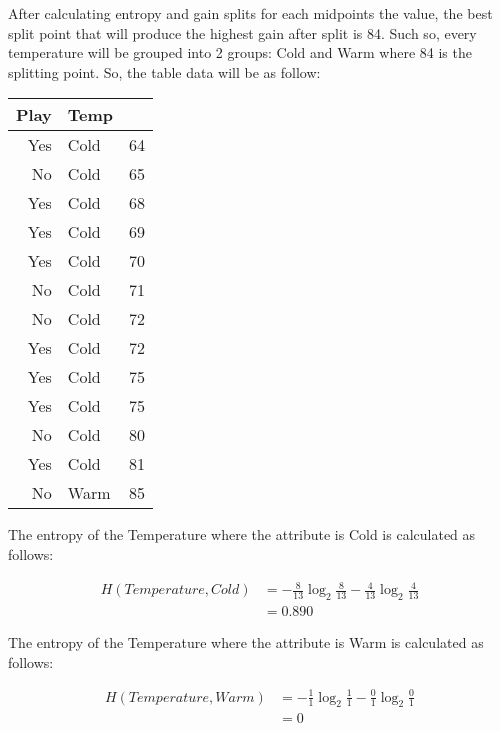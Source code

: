 \documentclass[
  11pt, %
]{assignment}
\begin{document}
After calculating entropy and gain splits for each midpoints the value, the best split point that will produce the highest gain after split is 84. Such so, every temperature will be grouped into 2 groups: Cold and Warm where 84 is the splitting point. So, the table data will be as follow:

\begin{center}
	\begin{tabular}{r l c}
		Play & Temp      \\
		\toprule
		Yes  & Cold & 64 \\
		No   & Cold & 65 \\
		Yes  & Cold & 68 \\
		Yes  & Cold & 69 \\
		Yes  & Cold & 70 \\
		No   & Cold & 71 \\
		No   & Cold & 72 \\
		Yes  & Cold & 72 \\
		Yes  & Cold & 75 \\
		Yes  & Cold & 75 \\
		No   & Cold & 80 \\
		Yes  & Cold & 81 \\
		No   & Warm & 85 \\
		\bottomrule
	\end{tabular}
\end{center}

The entropy of the Temperature where the attribute is Cold is calculated as follows:

\begin{equation}
	\label{eq:entropy-temp-cold}
	\begin{split}
		H(Temperature, Cold) &= -\frac{8}{13} \log_2 \frac{8}{13} - \frac{4}{13} \log_2 \frac{4}{13} \\
		&= 0.890
	\end{split}
\end{equation}

The entropy of the Temperature where the attribute is Warm is calculated as follows:

\begin{equation}
	\label{eq:entropy-temp-warm}
	\begin{split}
		H(Temperature, Warm) &= -\frac{1}{1} \log_2 \frac{1}{1} - \frac{0}{1} \log_2 \frac{0}{1} \\
		&= 0
	\end{split}
\end{equation}
\end{document}
